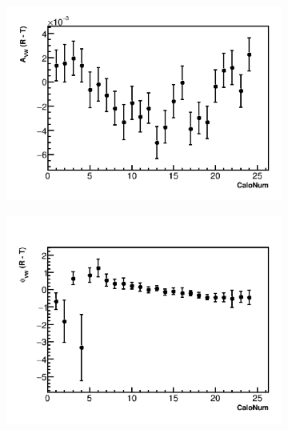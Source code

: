 \documentclass[12pt,letterpaper]{article}
\begin{document}
\begin{figure}[]
    \begin{subfigure}[t]{0.45\textwidth}
        \centering
        \includegraphics[width=\textwidth]{9d_noTimeRand_Avw_Diff}
        \caption{}
    \end{subfigure}%
    \begin{subfigure}[t]{0.45\textwidth}
        \centering
        \includegraphics[width=\textwidth]{9d_noTimeRand_Phivw_Diff}
        \caption{}
    \end{subfigure}
\caption[]{}
\label{}
\end{figure}
\end{document}
